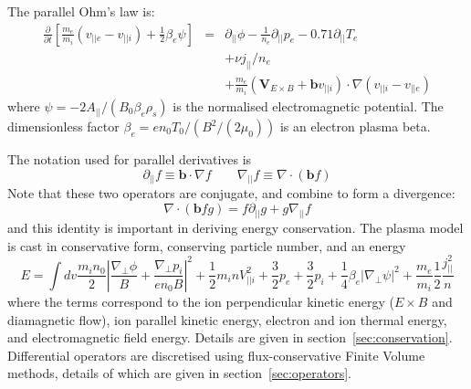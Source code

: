 \documentclass[12pt,a4paper]{article}
\begin{document}
The parallel Ohm's law is:
\begin{subequations}
  \begin{eqnarray}
    \frac{\partial}{\partial t}\left[\frac{m_e}{m_i}\left(v_{||e}-v_{||i}\right) + \frac{1}{2}\beta_e\psi\right] &=&  \partial_{||}\phi - \frac{1}{n_e}\partial_{||} p_e - 0.71\partial_{||} T_e \\
    && + \nu j_{||}/n_e \\
    &&+ \frac{m_e}{m_i}\left(\mathbf{V}_{E\times B} + \mathbf{b}v_{||i}\right)\cdot\nabla\left(v_{||i} - v_{||e}\right) \label{eq:hotion_ohm}
  \end{eqnarray}
\end{subequations}
where $\psi = -2A_{||} / \left(B_0\beta_e\rho_s\right)$ is the normalised electromagnetic
potential. The dimensionless factor $\beta_e = en_0T_0/\left(B^2 / \left(2\mu_0\right)\right)$ is an electron plasma beta.

The notation used for parallel derivatives is
\begin{equation}
  \partial_{||} f \equiv \mathbf{b}\cdot\nabla f \qquad \nabla_{||} f \equiv \nabla\cdot\left(\mathbf{b} f\right)
\end{equation}
Note that these two operators are conjugate, and combine to form a divergence:
\[
\nabla\cdot\left(\mathbf{b}fg\right) = f\partial_{||} g + g \nabla_{||} f
\]
and this identity is important in deriving energy conservation.
The plasma model is cast in conservative form, conserving particle number, and an energy
\begin{equation}
E = \int dv \frac{m_in_0}{2}\left|\frac{\nabla_\perp\phi}{B} + \frac{\nabla_\perp p_i}{en_0B}\right|^2 + \frac{1}{2}m_inV_{||i}^2 + \frac{3}{2}p_e + \frac{3}{2}p_i + \frac{1}{4}\beta_e\left|\nabla_\perp\psi\right|^2 + \frac{m_e}{m_i}\frac{1}{2}\frac{j_{||}^2}{n}
\end{equation}
where the terms correspond to the ion perpendicular kinetic energy ($E\times B$ and diamagnetic flow), ion parallel kinetic energy, electron and ion thermal energy, and electromagnetic field energy. Details are given in section~\ref{sec:conservation}. Differential operators are discretised using flux-conservative Finite Volume methods, details of which are given in section~\ref{sec:operators}. 
\end{document}
